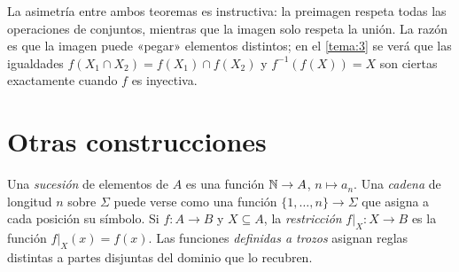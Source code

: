 La asimetría entre ambos teoremas es instructiva: la preimagen respeta todas las operaciones de conjuntos, mientras que la imagen solo respeta la unión. La razón es que la imagen puede «pegar» elementos distintos; en el \cref{tema:3} se verá que las igualdades $f(X_1\cap X_2)=f(X_1)\cap f(X_2)$ y $f^{-1}(f(X))=X$ son ciertas exactamente cuando $f$ es inyectiva.

\section{Otras construcciones}

Una \emph{sucesión} de elementos de $A$ es una función $\mathbb{N}\to A$, $n\mapsto a_n$. Una \emph{cadena} de longitud $n$ sobre $\Sigma$ puede verse como una función $\{1,\dots,n\}\to\Sigma$ que asigna a cada posición su símbolo. Si $f\colon A\to B$ y $X\subseteq A$, la \emph{restricción} $f|_X\colon X\to B$ es la función $f|_X(x)=f(x)$. Las funciones \emph{definidas a trozos} asignan reglas distintas a partes disjuntas del dominio que lo recubren.

\addtocounter{definicion}{1}%

\addtocounter{definicion}{1}%

